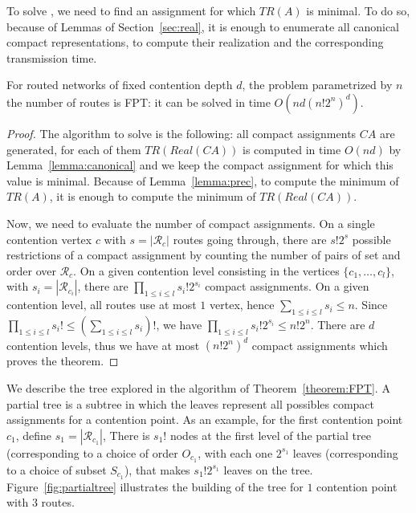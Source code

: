 To solve \spall, we need to find an assignment for which $TR(A)$ is minimal. 
To do so, because of Lemmas of Section~\ref{sec:real}, it is enough to 
enumerate all canonical compact representations, to compute their realization and the corresponding transmission time.

\begin{theorem}\label{theorem:FPT}
For routed networks of fixed contention depth $d$, the problem \spall parametrized by $n$ the number of routes is FPT: it can be solved in time $O(nd(n!2^{n})^{d})$.
\end{theorem}
\begin{proof}
The algorithm to solve \spall is the following: all compact assignments $CA$ are generated, for each of them $TR(Real(CA))$ is computed in time
$O(nd)$ by Lemma~\ref{lemma:canonical} and we keep the compact assignment for which this value is minimal.  Because of Lemma~\ref{lemma:prec}, to compute the minimum of $TR(A)$, it is enough 
to compute the minimum of $TR(Real(CA))$.

 Now, we need to evaluate the number of compact assignments. 
On a single contention vertex $c$ with $s = |\mathcal{R}_c|$ routes going through, there are $s!2^s$ possible restrictions of a compact assignment by counting the number of pairs of set and order over $\mathcal{R}_c$.
On a given contention level consisting in the vertices $\{c_1,\dots,c_l\}$, with $s_i = |\mathcal{R}_{c_{i}}|$, there are 
$\prod_{1 \leq i\leq l} s_i!2^{s_i}$ compact assignments. On a given contention level, all routes use at most $1$ vertex, hence $\sum_{1 \leq i\leq l} s_i \leq n$. Since $\prod_{1 \leq i\leq l} s_i! \leq (\sum_{1 \leq i\leq l} s_i)!$, we have $\prod_{1 \leq i\leq l} s_i!2^{s_i} \leq n!2^n$. There are $d$ contention levels, thus we have at most $ (n!2^{n})^{d}$ compact assignments which proves the theorem.
\end{proof}

We describe the tree explored in the algorithm of Theorem~\ref{theorem:FPT}. A partial tree is a subtree in which the leaves represent all possibles compact assignments for a contention point. As an example, for the first contention point $c_1$, define $s_1 = |\mathcal{R}_{c_1}|$, There is $s_1!$ nodes at the first level of the partial tree (corresponding to a choice of order $O_{c_1}$, with each one $2^{s_1}$ leaves (corresponding to a choice of subset $S_{c_1}$), that makes $s_1!2^{s_1}$ leaves on the tree. Figure~\ref{fig:partialtree} illustrates the building of the tree for $1$ contention point with $3$ routes.

